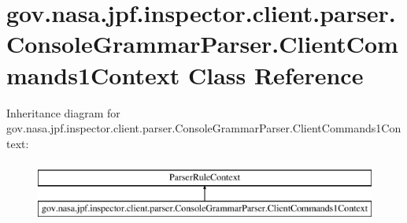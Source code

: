 \hypertarget{classgov_1_1nasa_1_1jpf_1_1inspector_1_1client_1_1parser_1_1_console_grammar_parser_1_1_client_commands1_context}{}\section{gov.\+nasa.\+jpf.\+inspector.\+client.\+parser.\+Console\+Grammar\+Parser.\+Client\+Commands1\+Context Class Reference}
\label{classgov_1_1nasa_1_1jpf_1_1inspector_1_1client_1_1parser_1_1_console_grammar_parser_1_1_client_commands1_context}
Inheritance diagram for gov.\+nasa.\+jpf.\+inspector.\+client.\+parser.\+Console\+Grammar\+Parser.\+Client\+Commands1\+Context\+:\begin{figure}[H]
\begin{center}
\leavevmode
\includegraphics[height=2.000000cm]{classgov_1_1nasa_1_1jpf_1_1inspector_1_1client_1_1parser_1_1_console_grammar_parser_1_1_client_commands1_context}
\end{center}
\end{figure}
